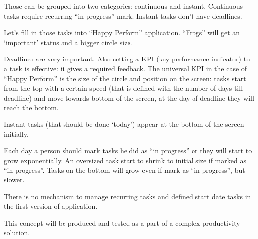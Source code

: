 Those can be grouped into two categories: continuous and instant. Continuous tasks require recurring ``in progress'' mark. Instant tasks don't have deadlines.

Let's fill in those tasks into ``Happy Perform'' application. ``Frogs'' will get an `important' status and a bigger circle size.

Deadlines are very important. Also setting a KPI (key performance indicator) to a task is effective: it gives a required feedback. The universal KPI in the case of ``Happy Perform'' is the size of the circle and position on the screen: tasks start from the top with a certain speed (that is defined with the number of days till deadline) and move towards bottom of the screen, at the day of deadline they will reach the bottom.

Instant tasks (that should be done `today') appear at the bottom of the screen initially.

Each day a person should mark tasks he did as ``in progress'' or they will start to grow exponentially. An oversized task start to shrink to initial size if marked as ``in progress''. Tasks on the bottom will grow even if mark as ``in progress'', but slower.

There is no mechanism to manage recurring tasks and defined start date tasks in the first version of application.

This concept will be produced and tested as a part of a complex productivity solution.


